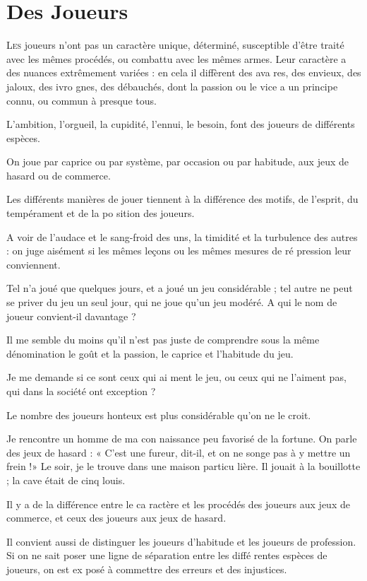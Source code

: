 \chapter[Des joueurs]{Des Joueurs}

\lettrine{L}{es} joueurs n'ont pas un caractère
unique, déterminé, susceptible d'être
traité avec les mêmes procédés, ou
combattu avec les mêmes armes. Leur
caractère a des nuances extrêmement
variées : en cela il diffèrent des ava%
res, des envieux, des jaloux, des ivro%
gnes, des débauchés, dont la passion
ou le vice a un principe connu, ou
commun à presque tous.

L'ambition, l'orgueil, la cupidité,
l'ennui, le besoin, font des joueurs de
différents espèces.

On joue par caprice ou par système,
par occasion ou par habitude, aux jeux
de hasard ou de commerce.

Les différents manières de jouer
tiennent à la différence des motifs, de
l'esprit, du tempérament et de la po%
sition des joueurs.

A voir de l'audace et le sang-froid des
uns, la timidité et la turbulence des
autres : on juge aisément si les mêmes
leçons ou les mêmes mesures de ré%
pression leur conviennent.

Tel n'a joué que quelques jours, et
a joué un jeu considérable ; tel autre
ne peut se priver du jeu un seul jour,
qui ne joue qu'un jeu modéré. A qui le
nom de joueur convient-il davantage ?

Il me semble du moins qu'il n'est
pas juste de comprendre sous la même
dénomination le goût et la passion, le
caprice et l'habitude du jeu.

Je me demande si ce sont ceux qui ai%
ment le jeu, ou ceux qui ne l'aiment
pas, qui dans la société ont exception ?

Le nombre des joueurs honteux est
plus considérable qu'on ne le croit.

Je rencontre un homme de ma con%
naissance peu favorisé de la fortune.
On parle des jeux de hasard : « C'est
une fureur, dit-il, et on ne songe
pas à y mettre un frein !» Le soir,
je le trouve dans une maison particu%
lière. Il jouait à la bouillotte ; la cave
était de cinq louis.

Il y a de la différence entre le ca%
ractère et les procédés des joueurs aux
jeux de commerce, et ceux des joueurs
aux jeux de hasard.

Il convient aussi de distinguer les 
joueurs d'habitude et les joueurs de
profession. Si on ne sait poser une
ligne de séparation entre les diffé%
rentes espèces de joueurs, on est ex%
posé à commettre des erreurs et des
injustices.

